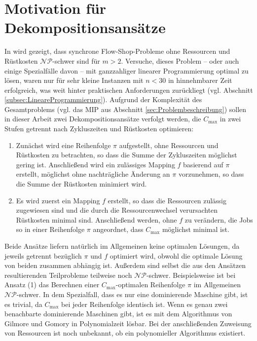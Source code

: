 \documentclass{scrreprt}
\begin{document}
\section{Motivation für Dekompositionsansätze}
In \cite{preprint} wird gezeigt, dass synchrone Flow-Shop-Probleme ohne Ressourcen und Rüstkosten $\mathcal{NP}$-schwer sind für $m>2$.
Versuche, dieses Problem -- oder auch einige Spezialfälle davon -- mit ganzzahliger linearer Programmierung optimal zu lösen, waren nur für sehr kleine Instanzen mit
$n<30$ in hinnehmbarer Zeit erfolgreich, was weit hinter praktischen Anforderungen zurückliegt (vgl. Abschnitt \ref{subsec:LineareProgrammierung}).
Aufgrund der Komplexität des Gesamtproblems (vgl. das MIP aus Abschnitt \ref{sec:Problembeschreibung}) sollen in dieser Arbeit zwei Dekompositionsansätze verfolgt werden,
die $C_{\max}$ in zwei Stufen getrennt nach Zykluszeiten und Rüstkosten optimieren:
\begin{enumerate}
    \item Zunächst wird eine Reihenfolge $\pi$ aufgestellt, ohne Ressourcen und Rüstkosten zu betrachten, so dass die Summe der Zykluszeiten möglichst gering ist.
        Anschließend wird ein zulässiges Mapping $f$ basierend auf $\pi$ erstellt, möglichst ohne nachträgliche Änderung an $\pi$ vorzunehmen,
        so dass die Summe der Rüstkosten minimiert wird.
    \item Es wird zuerst ein Mapping $f$ erstellt, so dass die Ressourcen zulässig zugewiesen sind und die durch die Ressourcenwechsel verursachten Rüstkosten minimal sind.
        Anschließend werden, ohne $f$ zu verändern, die Jobs so in einer Reihenfolge $\pi$ angeordnet, dass $C_{\max}$ möglichst minimal ist.
\end{enumerate}%
Beide Ansätze liefern natürlich im Allgemeinen keine optimalen Lösungen, da jeweils getrennt bezüglich $\pi$ und $f$ optimiert wird,
obwohl die optimale Lösung von beiden zusammen abhängig ist.
Außerdem sind selbst die aus den Ansätzen resultierenden Teilprobleme teilweise noch $\mathcal{NP}$-schwer.
Beispielsweise ist bei Ansatz (1) das Berechnen einer $C_{\max}$-optimalen Reihenfolge $\pi$ im Allgemeinen $\mathcal{NP}$-schwer. 
In dem Spezialfall, dass es nur eine dominierende Maschine gibt, ist es trivial, da $C_{\max}$ bei jeder Reihenfolge identisch ist.
Wenn es genau zwei benachbarte dominierende Maschinen gibt,
ist es mit dem Algorithmus von Gilmore und Gomory \cite{gg} in Polynomialzeit lösbar.
Bei der anschließenden Zuweisung von Ressourcen ist noch unbekannt, ob ein polynomieller Algorithmus existiert.
\end{document}
